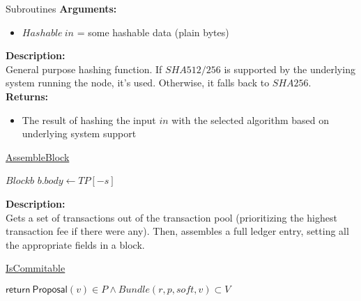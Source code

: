 \documentclass[10pt,a4paper]{article}
\begin{document}
\begin{section}{Subroutines}
\noindent \textbf{Arguments:}
\begin{itemize}
    \item $Hashable \ in$ = some hashable data (plain bytes)
  \end{itemize}

\noindent \textbf{Description:}\\
General purpose hashing function. If $SHA512/256$ is supported by the underlying system running the node, it's used.
Otherwise, it falls back to $SHA256$.\\

\noindent \textbf{Returns:}
\begin{itemize}
    \item The result of hashing the input $in$ with the selected algorithm based on underlying system support
  \end{itemize}


\begin{algorithm}[H]
    \caption{\underline{AssembleBlock}}    
    \label{algo:assemble-block}
    \begin{algorithmic}[1]

    \State $Block b$
    \State $b.body \gets TP[-s]$

    \EndFunction
    \end{algorithmic}
\end{algorithm}

\noindent \textbf{Description:}\\
Gets a set of transactions out of the transaction pool (prioritizing the highest transaction fee if there were any).
Then, assembles a full ledger entry, setting all the appropriate fields in a block.


\begin{algorithm}[H]
    \caption{\underline{IsCommitable}}
    \label{algo:is-commitable}
    \begin{algorithmic}[1]

    \State $\mathsf{return} \ \mathsf{Proposal}(v) \in P \land Bundle(r,p,soft,v) \subset V$

    \EndFunction
    \end{algorithmic}
\end{algorithm}



\end{section}
\end{document}
